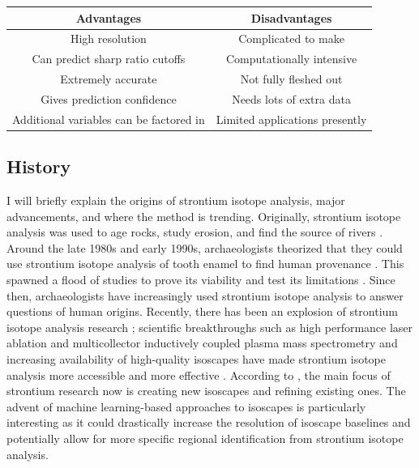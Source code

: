 \documentclass[a4paper, 12pt]{article}
\begin{document}
\begin{center}
    \begin{tabular}{||c | c||}
        \hline
        Advantages                              & Disadvantages                  \\ [0.5ex]
        \hline\hline
        High resolution                         & Complicated to make            \\
        \hline
        Can predict sharp ratio cutoffs         & Computationally intensive      \\
        \hline
        Extremely accurate                      & Not fully fleshed out          \\
        \hline
        Gives prediction confidence             & Needs lots of extra data       \\
        \hline
        Additional variables can be factored in & Limited applications presently \\[1ex]
        \hline
    \end{tabular}
\end{center}


\subsection{History}
I will briefly explain the origins of strontium isotope analysis, major advancements,
and where the method is trending. Originally, strontium isotope analysis was used to age rocks, study erosion, and
find the source of rivers \citep*{moorbath1965, crowley2017}. Around the late 1980s and early 1990s, archaeologists theorized
that they could use strontium isotope analysis of tooth enamel to find human provenance \citep{crowley2017}. This spawned
a flood of studies to prove its viability and test its limitations \citep{crowley2017}.
Since then, archaeologists have increasingly used strontium isotope analysis to answer
questions of human origins. Recently, there has been an explosion of strontium
isotope analysis research \citep{crowley2017}; scientific
breakthroughs such as high performance laser ablation and multicollector inductively coupled
plasma mass spectrometry and increasing availability of high-quality isoscapes \citep{crowley2017}
have made strontium isotope analysis more accessible and more effective \citep{holt2021}.
According to \cite{holt2021}, the main focus of strontium research now is creating new isoscapes
and refining existing ones. The advent of machine learning-based approaches to isoscapes
is particularly interesting as it could drastically increase the resolution of isoscape
baselines and potentially allow for more specific regional identification from strontium
isotope analysis.
\end{document}
